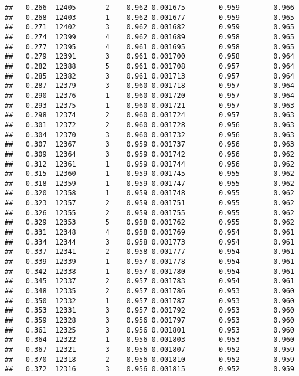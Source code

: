 \documentclass[
]{book}
\begin{document}
\begin{verbatim}
##   0.266  12405       2    0.962 0.001675        0.959        0.966
##   0.268  12403       1    0.962 0.001677        0.959        0.965
##   0.271  12402       3    0.962 0.001682        0.959        0.965
##   0.274  12399       4    0.962 0.001689        0.958        0.965
##   0.277  12395       4    0.961 0.001695        0.958        0.965
##   0.279  12391       3    0.961 0.001700        0.958        0.964
##   0.282  12388       5    0.961 0.001708        0.957        0.964
##   0.285  12382       3    0.961 0.001713        0.957        0.964
##   0.287  12379       3    0.960 0.001718        0.957        0.964
##   0.290  12376       1    0.960 0.001720        0.957        0.964
##   0.293  12375       1    0.960 0.001721        0.957        0.963
##   0.298  12374       2    0.960 0.001724        0.957        0.963
##   0.301  12372       2    0.960 0.001728        0.956        0.963
##   0.304  12370       3    0.960 0.001732        0.956        0.963
##   0.307  12367       3    0.959 0.001737        0.956        0.963
##   0.309  12364       3    0.959 0.001742        0.956        0.962
##   0.312  12361       1    0.959 0.001744        0.956        0.962
##   0.315  12360       1    0.959 0.001745        0.955        0.962
##   0.318  12359       1    0.959 0.001747        0.955        0.962
##   0.320  12358       1    0.959 0.001748        0.955        0.962
##   0.323  12357       2    0.959 0.001751        0.955        0.962
##   0.326  12355       2    0.959 0.001755        0.955        0.962
##   0.329  12353       5    0.958 0.001762        0.955        0.962
##   0.331  12348       4    0.958 0.001769        0.954        0.961
##   0.334  12344       3    0.958 0.001773        0.954        0.961
##   0.337  12341       2    0.958 0.001777        0.954        0.961
##   0.339  12339       1    0.957 0.001778        0.954        0.961
##   0.342  12338       1    0.957 0.001780        0.954        0.961
##   0.345  12337       2    0.957 0.001783        0.954        0.961
##   0.348  12335       2    0.957 0.001786        0.953        0.960
##   0.350  12332       1    0.957 0.001787        0.953        0.960
##   0.353  12331       3    0.957 0.001792        0.953        0.960
##   0.359  12328       3    0.956 0.001797        0.953        0.960
##   0.361  12325       3    0.956 0.001801        0.953        0.960
##   0.364  12322       1    0.956 0.001803        0.953        0.960
##   0.367  12321       3    0.956 0.001807        0.952        0.959
##   0.370  12318       2    0.956 0.001810        0.952        0.959
##   0.372  12316       3    0.956 0.001815        0.952        0.959

\end{verbatim}
\end{document}
